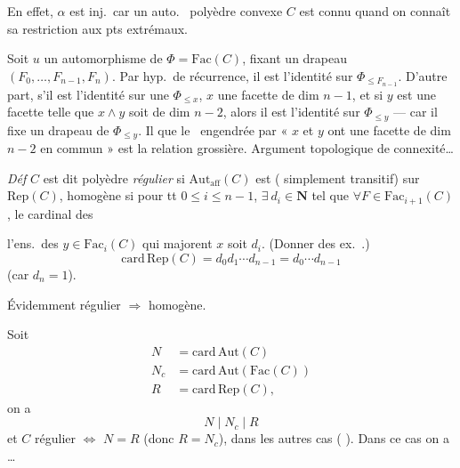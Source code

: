 \documentclass[11pt,a4paper]{article}
\begin{document}
En effet, $\alpha$ est inj.\ car un auto.\  polyèdre
convexe $C$ est connu quand on connaît sa restriction aux pts extrémaux.

Soit $u$ un automorphisme de $\Phi = \mathrm{Fac}(C)$, fixant un drapeau
$(F_0, \dots, F_{n-1}, F_n)$. Par hyp.\ de récurrence, il 
 est l'identité sur $\Phi_{\le F_{n-1}}$. D'autre
part, s'il est l'identité sur une  $\Phi_{\le x}$, $x$ une
facette de dim $n-1$, et si $y$ est une facette telle que $x \wedge y$ soit
de dim $n-2$, alors il est l'identité sur $\Phi_{\le y}$ --- car il fixe
un drapeau de $\Phi_{\le y}$. Il  \struck{\ill{}}
que le \ engendrée par « $x$ et $y$ ont une
facette de dim $n-2$ en commun » est la relation grossière. \struck{\ill{}
\ill{}} Argument topologique de connexité\ldots
{}

\emph{Déf} $C$ \struck{\ill{}} est dit polyèdre \emph{régulier} si
$\mathrm{Aut}_{\mathrm{aff}}(C)$ est  (
simplement transitif) sur $\mathrm{Rep}(C)$, homogène si pour tt $0
\leqslant i \leqslant n-1$, $\exists\ d_i \in \mathbf{N}$ tel que $\forall F
\in \mathrm{Fac}_{i+1}(C)$, le cardinal des

l'ens.\ des  $y \in \mathrm{Fac}_{i}(C)$ qui majorent $x$
soit $d_i$. (Donner des ex.\ \ill{}.)
\[
  \mathrm{card}\, \mathrm{Rep}(C) = d_0 d_1 \cdots d_{n-1} = d_0 \cdots
  d_{n-1}
\]
(car $d_n = 1$). 

Évidemment régulier $\Rightarrow$ homogène. 

Soit
\begin{align*}
  N &= \mathrm{card}\, \mathrm{Aut}(C) \\
  N_c &= \mathrm{card}\, \mathrm{Aut}(\mathrm{Fac}(C)) \\
  R &= \mathrm{card}\, \mathrm{Rep}(C),
\end{align*}
on a
\[
  N \mid N_c \mid R
\]
et $C$ régulier $\Longleftrightarrow$ $N = R$ (donc $R = N_c$), dans les
autres cas  \ill{} ( \ill{}
). Dans ce cas on a \ldots
\end{document}
